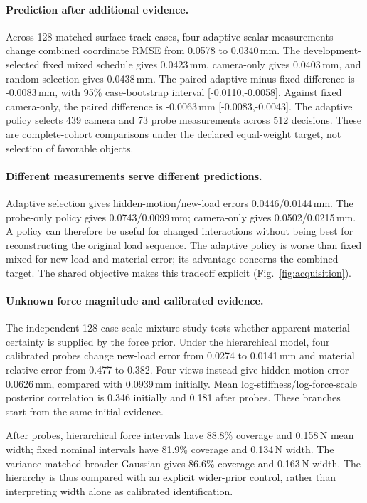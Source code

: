 \paragraph{Prediction after additional evidence.}
Across 128 matched surface-track cases, four adaptive scalar measurements change combined coordinate RMSE from 0.0578 to 0.0340\,mm. The development-selected fixed mixed schedule gives 0.0423\,mm, camera-only gives 0.0403\,mm, and random selection gives 0.0438\,mm. The paired adaptive-minus-fixed difference is -0.0083\,mm, with 95\% case-bootstrap interval [-0.0110,-0.0058]. Against fixed camera-only, the paired difference is -0.0063\,mm [-0.0083,-0.0043]. The adaptive policy selects 439 camera and 73 probe measurements across 512 decisions. These are complete-cohort comparisons under the declared equal-weight target, not selection of favorable objects.

\paragraph{Different measurements serve different predictions.}
Adaptive selection gives hidden-motion/new-load errors 0.0446/0.0144\,mm. The probe-only policy gives 0.0743/0.0099\,mm; camera-only gives 0.0502/0.0215\,mm. A policy can therefore be useful for changed interactions without being best for reconstructing the original load sequence. The adaptive policy is worse than fixed mixed for new-load and material error; its advantage concerns the combined target. The shared objective makes this tradeoff explicit (Fig.~\ref{fig:acquisition}).

\paragraph{Unknown force magnitude and calibrated evidence.}
The independent 128-case scale-mixture study tests whether apparent material certainty is supplied by the force prior. Under the hierarchical model, four calibrated probes change new-load error from 0.0274 to 0.0141\,mm and material relative error from 0.477 to 0.382. Four views instead give hidden-motion error 0.0626\,mm, compared with 0.0939\,mm initially. Mean log-stiffness/log-force-scale posterior correlation is 0.346 initially and 0.181 after probes. These branches start from the same initial evidence.

After probes, hierarchical force intervals have 88.8\% coverage and 0.158\,N mean width; fixed nominal intervals have 81.9\% coverage and 0.134\,N width. The variance-matched broader Gaussian gives 86.6\% coverage and 0.163\,N width. The hierarchy is thus compared with an explicit wider-prior control, rather than interpreting width alone as calibrated identification.

